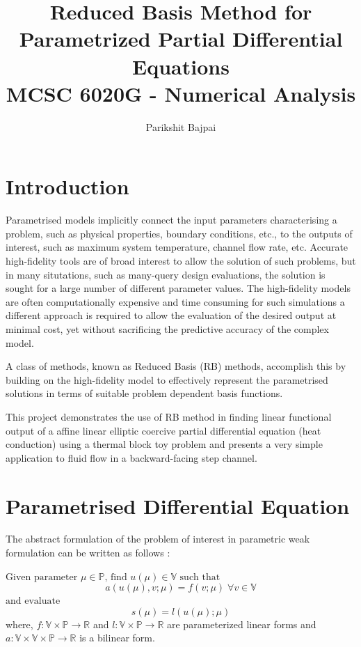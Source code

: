 \documentclass[11pt, oneside]{article}
\title{ Reduced Basis Method for Parametrized Partial Differential Equations\\
        \normalsize MCSC 6020G - Numerical Analysis}
\author{Parikshit Bajpai}
\date{}
\begin{document}
\maketitle

\section{Introduction}
Parametrised models implicitly connect the input parameters characterising a problem, such as physical properties, boundary conditions, etc., to the outputs of interest, such as maximum system temperature, channel flow rate, etc. Accurate high-fidelity tools are of broad interest to allow the solution of such problems, but in many situtations, such as many-query design evaluations, the solution is sought for a large number of different parameter values. The high-fidelity models are often computationally expensive and time consuming for such simulations a different approach is required to allow the evaluation of the desired output at minimal cost, yet without sacrificing the predictive accuracy of the complex model.

A class of methods, known as Reduced Basis (RB) methods, accomplish this by building on the high-fidelity model to effectively represent the parametrised solutions in terms of suitable problem dependent basis functions.

This project demonstrates the use of RB method in finding linear functional output of a affine linear elliptic coercive partial differential equation (heat conduction) using a thermal block toy problem and presents a very simple application to fluid flow in a backward-facing step channel.

\section{Parametrised Differential Equation}
The abstract formulation of the problem of interest in parametric weak formulation can be written as follows \cite{quarteroni2017}:

$\text{Given parameter } \mu \in \mathbb{P} \text{, find }u(\mu) \in \mathbb{V} \text{ such that }$
\begin{equation}\label{eq:1}
  a(u(\mu), v; \mu) = f(v;\mu)  \mspace{5mu} \forall v \in \mathbb{V}
\end{equation}
$\text{and evaluate}$
\begin{equation}\label{eq:2}
  s(\mu) = l(u(\mu);\mu)
\end{equation}
where, $f:\mathbb{V} \times \mathbb{P} \rightarrow \mathbb{R}$ and $l:\mathbb{V} \times \mathbb{P} \rightarrow \mathbb{R}$ are parameterized linear forms and $a:\mathbb{V} \times \mathbb{V} \times \mathbb{P} \rightarrow \mathbb{R}$ is a bilinear form.
\end{document}
